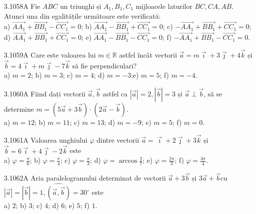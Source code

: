 \documentclass[11pt]{article}
\begin{document}
3.1058A Fie $A B C$ un triunghi și $A_{1}, B_{1}, C_{1}$ mijloacele laturilor $B C, C A, A B$. Atunci una din egalitățile următoare este verificată:\\ a) $\overrightarrow{A A_{1}}+\overrightarrow{B B_{1}}-\overrightarrow{C C_{1}}=0$; b) $\overrightarrow{A A_{1}}-\overrightarrow{B B_{1}}+\overrightarrow{C C_{1}}=0$; c) $-\overrightarrow{A A_{1}}+\overrightarrow{B B_{1}}+\overrightarrow{C C_{1}}=0$; d) $\overrightarrow{A A_{1}}+\overrightarrow{B B_{1}}+\overrightarrow{C C_{1}}=0$; e) $\overrightarrow{A A_{1}}-\overrightarrow{B B_{1}}-\overrightarrow{C C_{1}}=0$; f) $-\overrightarrow{A A_{1}}+\overrightarrow{B B_{1}}-\overrightarrow{C C_{1}}=0$.

3.1059A Care este valoarea lui $m \in \mathbb{R}$ astfel încât vectorii $\vec{a}=m \vec{\imath}+3 \vec{\jmath}+4 \vec{k}$ și $\vec{b}=4 \vec{\imath}+m \vec{\jmath}-7 \vec{k}$ să fie perpendiculari?\\ a) $m=2$; b) $m=3$; c) $m=4$; d) $m=-3$;e) $m=5$; f) $m=-4$.

3.1060A Fiind dați vectorii $\vec{a}, \vec{b}$ astfel ca $|\vec{a}|=2,|\vec{b}|=3$ și $\vec{a} \perp \vec{b}$, să se determine $m=(5 \vec{a}+3 \vec{b}) \cdot(2 \vec{a}-\vec{b})$.\\ a) $m=12$; b) $m=11$; c) $m=13$; d) $m=-9$; e) $m=5$; f) $m=0$.

3.1061A Valoarea unghiului $\varphi$ dintre vectorii $\vec{a}=\vec{\imath}+2 \vec{\jmath}+3 \vec{k}$ și $\vec{b}=6 \vec{\imath}+4 \vec{\jmath}-2 \vec{k}$ este\\ a) $\varphi=\frac{\pi}{6}$; b) $\varphi=\frac{\pi}{4}$; c) $\varphi=\frac{\pi}{3}$; d) $\varphi=\arccos \frac{2}{7}$; e) $\varphi=\frac{2 \pi}{3}$; f) $\varphi=\frac{3 \pi}{4}$.

3.1062A Aria paralelogramului determinat de vectorii $\vec{a}+3 \vec{b}$ și $3 \vec{a}+\vec{b} \mathrm{cu}$ $|\vec{a}|=|\vec{b}|=1, \widehat{(\vec{a}, \vec{b})}=30^{\circ}$ este\\ a) $2$; b) $3$; c) $4$; d) $6$; e) $5$; f) $1$.
\end{document}
